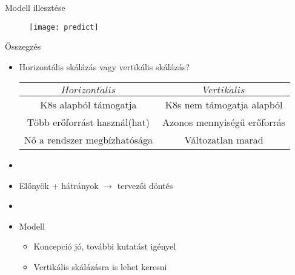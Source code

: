 \documentclass{beamer}
\begin{document}
\begin{frame}[t]{Modell illesztése}
\begin{figure}
	\centering
	\texttt{[image: predict]}
\end{figure}
\end{frame}


\begin{frame}[t]{Összegzés}
\begin{itemize}
\item Horizontális skálázás vagy vertikális skálázás?
\begin{center}

\begin{tabular}{ c c }
 \centering
 $Horizont\acute{a}lis$ & $Vertik\acute{a}lis$  \\ [0.8ex] 
 \hline
 K8s alapból támogatja & K8s nem támogatja alapból  \\ 
 Több erőforrást használ(hat) & Azonos mennyiségű erőforrás  \\ 
 Nő a rendszer megbízhatósága & Változatlan marad \\   
\end{tabular}
\end{center}
\item[]
\item Előnyök + hátrányok $\rightarrow$ tervezői döntés
\item[]
\item Modell 
\begin{itemize}
\item Koncepció jó, további kutatást igényel
\item Vertikális skálázásra is lehet keresni
\end{itemize}
\end{itemize}
\end{frame}


	
\end{document}
